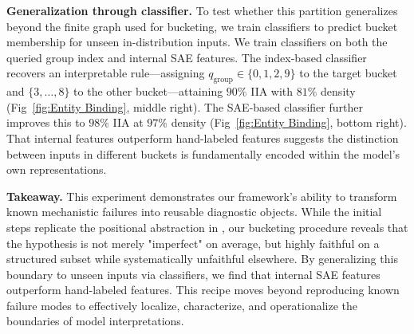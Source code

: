 \textbf{Generalization through classifier.}
To test whether this partition generalizes beyond the finite graph used for bucketing, we train classifiers to predict bucket membership for unseen in-distribution inputs. We train classifiers on both the queried group index and internal SAE features. The index-based classifier recovers an interpretable rule—assigning $q_{\mathrm{group}} \in \{0,1,2,9\}$ to the target bucket and $\{3, \dots, 8\}$ to the other bucket—attaining $90\%$ IIA with $81\%$ density (Fig~\ref{fig:Entity Binding}, middle right). The SAE-based classifier further improves this to $98\%$ IIA at $97\%$ density (Fig~\ref{fig:Entity Binding}, bottom right). That internal features outperform hand-labeled features suggests the distinction between inputs in different buckets is fundamentally encoded within the model's own representations.

\textbf{Takeaway.}
This experiment demonstrates our framework's ability to transform known mechanistic failures into reusable diagnostic objects. While the initial steps replicate the positional abstraction in \cite{gur2025mixing}, our bucketing procedure reveals that the hypothesis is not merely "imperfect" on average, but highly faithful on a structured subset while systematically unfaithful elsewhere. By generalizing this boundary to unseen inputs via classifiers, we find that internal SAE features outperform hand-labeled features. This recipe moves beyond reproducing known failure modes to effectively localize, characterize, and operationalize the boundaries of model interpretations.


